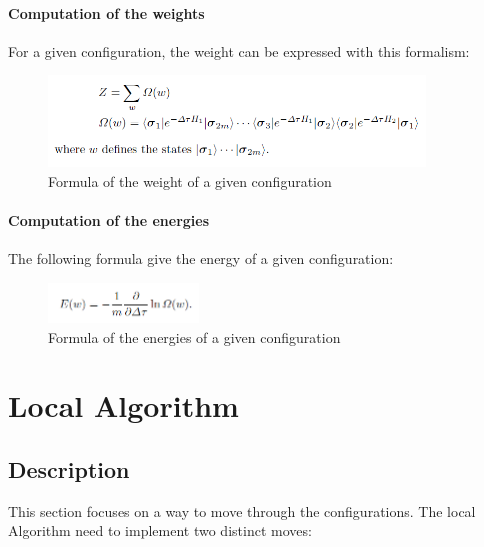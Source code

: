 \documentclass[a4paper,12pt]{article}
\begin{document}
	\paragraph{Computation of the weights} For a given configuration, the weight can be expressed with this formalism:

	\begin{figure}[H]

		\centering

		\includegraphics[width=10cm]{weights.png}

		\caption{Formula of the weight of a given configuration}

	\end{figure} 



	\paragraph{Computation of the energies} The following formula give the energy of a given configuration:

	\begin{figure}[H]

		\centering

		\includegraphics[width=4cm]{energies.png}

		\caption{Formula of the energies of a given configuration}

	\end{figure} 

	
	\newpage
	\section{Local Algorithm}
	\subsection{Description}

		
	 This section focuses on a way to move through the configurations.
	 The local Algorithm need to implement two distinct moves:
	 
\end{document}
